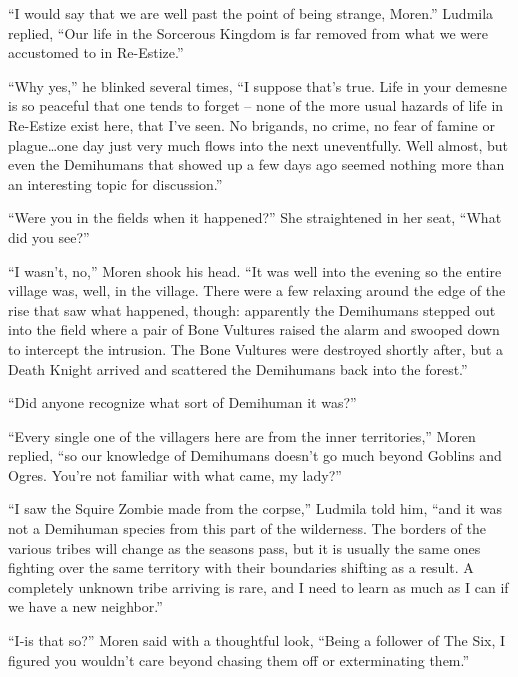 “I would say that we are well past the point of being strange, Moren.” Ludmila replied, “Our life in the Sorcerous Kingdom is far removed from what we were accustomed to in Re-Estize.”

 

“Why yes,” he blinked several times, “I suppose that’s true. Life in your demesne is so peaceful that one tends to forget – none of the more usual hazards of life in Re-Estize exist here, that I’ve seen. No brigands, no crime, no fear of famine or plague…one day just very much flows into the next uneventfully. Well almost, but even the Demihumans that showed up a few days ago seemed nothing more than an interesting topic for discussion.”

 

“Were you in the fields when it happened?” She straightened in her seat, “What did you see?”

 

“I wasn’t, no,” Moren shook his head. “It was well into the evening so the entire village was, well, in the village. There were a few relaxing around the edge of the rise that saw what happened, though: apparently the Demihumans stepped out into the field where a pair of Bone Vultures raised the alarm and swooped down to intercept the intrusion. The Bone Vultures were destroyed shortly after, but a Death Knight arrived and scattered the Demihumans back into the forest.”

 

“Did anyone recognize what sort of Demihuman it was?”

 

“Every single one of the villagers here are from the inner territories,” Moren replied, “so our knowledge of Demihumans doesn’t go much beyond Goblins and Ogres. You’re not familiar with what came, my lady?”

 

“I saw the Squire Zombie made from the corpse,” Ludmila told him, “and it was not a Demihuman species from this part of the wilderness. The borders of the various tribes will change as the seasons pass, but it is usually the same ones fighting over the same territory with their boundaries shifting as a result. A completely unknown tribe arriving is rare, and I need to learn as much as I can if we have a new neighbor.”

 

“I-is that so?” Moren said with a thoughtful look, “Being a follower of The Six, I figured you wouldn’t care beyond chasing them off or exterminating them.”

